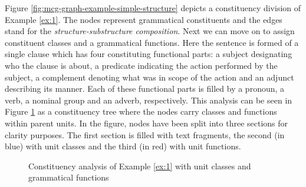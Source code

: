 Figure \ref{fig:mcg-graph-example-simple-structure} depicts a constituency division of Example \ref{ex:1}.%
The nodes represent grammatical constituents and the edges stand for the \textit{structure-substructure composition}. 
Next we can move on to assign constituent classes and a grammatical functions. %
Here the sentence is formed of a single clause which has four constituting functional parts: a subject designating who the clause is about, a predicate indicating the action performed by the subject, a complement denoting what was in scope of the action and an adjunct describing its manner. Each of these functional parts is filled by a pronoun, a verb, a nominal group and an adverb, respectively. This analysis can be seen in Figure \ref{fig:constit-classes-example} as a constituency tree where the nodes carry classes and functions within parent units. In the figure, nodes have been split into three sections for clarity purposes. The first section is filled with text fragments, the second (in blue) with unit classes and the third (in red) with unit functions. 

\begin{figure}[!ht]
    \centering
    \caption{Constituency analysis of Example \ref{ex:1} with unit classes and grammatical functions}
    \label{fig:constit-classes-example}
\end{figure}

